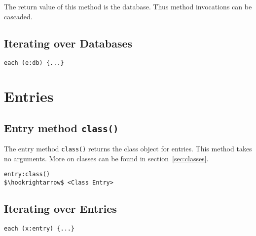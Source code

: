 \documentclass[11pt,a4paper]{scrbook}
\newcommand\method[1]{\texttt{#1}}
\begin{document}
The return value of this method is the database. Thus method invocations can
be cascaded.

\subsection{Iterating over Databases}


\begin{lstlisting}[language=BibTool,mathescape=true]
each (e:db) {...}
\end{lstlisting}

\section{Entries}


\subsection{Entry method \method{class()}}

The entry method \method{class()} returns the class object for entries. This
method takes no arguments. More on classes can be found in
section~\ref{sec:classes}.

\begin{lstlisting}[language=BibTool,mathescape=true]
entry:class()
$\hookrightarrow$ <Class Entry>
\end{lstlisting}

\subsection{Iterating over Entries}


\begin{lstlisting}[language=BibTool,mathescape=true]
each (x:entry) {...}
\end{lstlisting}
\end{document}
